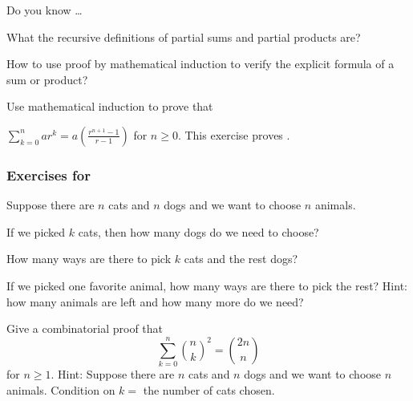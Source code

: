 \begin{exer}[\exerR] %
\label{exer_dyk_sum_proofs}
    Do you know \ldots
        \begin{exerpart}
            \item What the recursive definitions of partial sums and partial products are?
            \item How to use proof by mathematical induction to verify the explicit formula of a sum or product?
        \end{exerpart}
\end{exer}

\begin{exer}[\exerE] %
\label{exer_math_ind_geom_sum_formula}
    Use mathematical induction to prove  that
    
    $\displaystyle \sum_{k=0}^nar^k=a\left(\frac{r^{n+1}-1}{r-1}\right)$ for $n \ge 0$. This exercise proves .
\end{exer}


\subsubsection*{Exercises for  \subpffcombsums}

\begin{exer}[\exerP] %
\label{exer_count_cats_dogs}
    Suppose there are $n$ cats and $n$ dogs and we want to choose $n$ animals.
        \begin{exerpart}
            \item If we picked $k$ cats, then how many dogs do we need to choose?
            \item How many ways are there to pick $k$ cats and the rest dogs?
            \item \label{part_picked_fav_cat} If we picked one favorite animal, how many ways are there to pick the rest?  Hint: how many animals are left and how many more do we need?
        \end{exerpart}
\end{exer}

\begin{exer}[\exerU] %
\label{exer_comb_pf_sum_binom_sq}
    Give a combinatorial proof that 
        $$\displaystyle \sum_{k=0}^n\binom{n}{k}^2 = \binom{2n}{n}$$ 
    for $n \ge 1.$ Hint: Suppose there are $n$ cats and $n$ dogs and we want to choose $n$ animals.  Condition on $k=$ the number of cats chosen.  
\end{exer}

